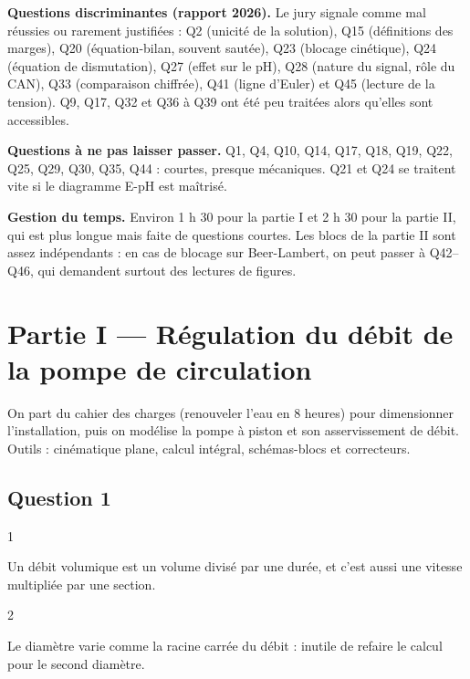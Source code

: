 \documentclass[11pt,a4paper]{article}
\begin{document}
\textbf{Questions discriminantes (rapport 2026).} Le jury signale comme mal réussies ou rarement justifiées : Q2 (unicité de la solution), Q15 (définitions des marges), Q20 (équation-bilan, souvent sautée), Q23 (blocage cinétique), Q24 (équation de dismutation), Q27 (effet sur le pH), Q28 (nature du signal, rôle du CAN), Q33 (comparaison chiffrée), Q41 (ligne d'Euler) et Q45 (lecture de la tension). Q9, Q17, Q32 et Q36 à Q39 ont été peu traitées alors qu'elles sont accessibles.

\textbf{Questions à ne pas laisser passer.} Q1, Q4, Q10, Q14, Q17, Q18, Q19, Q22, Q25, Q29, Q30, Q35, Q44 : courtes, presque mécaniques. Q21 et Q24 se traitent vite si le diagramme E-pH est maîtrisé.

\textbf{Gestion du temps.} Environ 1 h 30 pour la partie I et 2 h 30 pour la partie II, qui est plus longue mais faite de questions courtes. Les blocs de la partie II sont assez indépendants : en cas de blocage sur Beer-Lambert, on peut passer à Q42--Q46, qui demandent surtout des lectures de figures.

\hypertarget{partie-i-ruxe9gulation-du-duxe9bit-de-la-pompe-de-circulation}{%
\section{Partie I --- Régulation du débit de la pompe de circulation}\label{partie-i-ruxe9gulation-du-duxe9bit-de-la-pompe-de-circulation}}

On part du cahier des charges (renouveler l'eau en 8 heures) pour dimensionner l'installation, puis on modélise la pompe à piston et son asservissement de débit. Outils : cinématique plane, calcul intégral, schémas-blocs et correcteurs.

\hypertarget{question-1}{%
\subsection{Question 1}\label{question-1}}

\begin{indication}{1}

Un débit volumique est un volume divisé par une durée, et c'est aussi une vitesse multipliée par une section.

\end{indication}

\begin{indication}{2}

Le diamètre varie comme la racine carrée du débit : inutile de refaire le calcul pour le second diamètre.

\end{indication}
\end{document}
